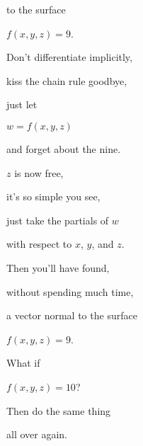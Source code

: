 \documentclass{ximera}
\begin{document}
to the surface

$f(x,y,z)=9$.

Don't differentiate implicitly,

kiss the chain rule goodbye,

just let 

$w=f(x,y,z)$

and forget about the nine.

$z$ is now free,

it's so simple you see,

just take the partials of $w$

with respect to $x$, $y$, and $z$.

Then you'll have found,

without spending much time,

a vector normal to the surface

$f(x,y,z) = 9$.

What if 

$f(x,y,z) = 10$?

Then do the same thing

all over again.
\end{document}
